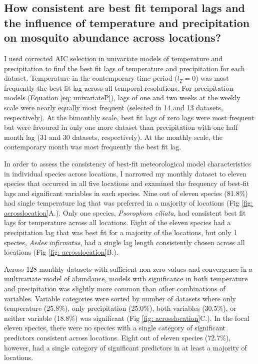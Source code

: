 \subsection{How consistent are best fit temporal lags and the influence of temperature and precipitation on mosquito abundance across locations?}

I used corrected AIC selection in univariate models of temperature and precipitation to find the best fit lags of temperature and precipitation for each dataset. Temperature in the contemporary time period ($l_T = 0$) was most frequently the best fit lag across all temporal resolutions. For precipitation models (Equation \ref{eq: univariateP}), lags of one and two weeks at the weekly scale were nearly equally most frequent (selected in 14 and 13 datasets, respectively). At the bimonthly scale, best fit lags of zero lags were most frequent but were favoured in only one more dataset than precipitation with one half month lag (31 and 30 datasets, respectively). At the monthly scale, the contemporary month was most frequently the best fit lag.

In order to assess the consistency of best-fit meteorological model characteristics in individual species across locations, I narrowed my monthly dataset to eleven species that occurred in all five locations and examined the frequency of best-fit lags and significant variables in each species. Nine out of eleven species (81.8\%) had single temperature lag that was preferred in a majority of locations (Fig \ref{fig: acrosslocation}A.). Only one species, \textit{Psorophora ciliata}, had consistent best fit lags for temperature across all locations. Eight of the eleven species had a precipitation lag that was best fit for a majority of the locations, but only 1 species, \textit{Aedes infirmatus}, had a single lag length consistently chosen across all locations (Fig \ref{fig: acrosslocation}B.).

Across 128 monthly datasets with sufficient non-zero values and convergence in a multivariate model of abundance, models with significance in both temperature and precipitation was slightly more common than other combinations of variables. Variable categories were sorted by number of datasets where only temperature (25.8\%), only precipitation (25.0\%), both variables (30.5\%), or neither variable (18.8\%) was significant (Fig \ref{fig: acrosslocation}C.). In the focal eleven species, there were no species with a single category of significant predictors consistent across locations. Eight out of eleven species (72.7\%), however, had a single category of significant predictors in at least a majority of locations.  



